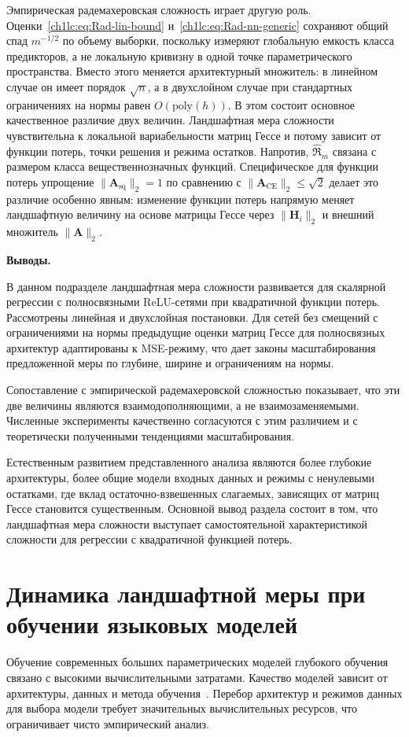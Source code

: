 Эмпирическая радемахеровская сложность играет другую роль. Оценки~\eqref{ch1lc:eq:Rad-lin-bound} и~\eqref{ch1lc:eq:Rad-nn-generic} сохраняют общий спад $m^{-1/2}$ по объему выборки, поскольку измеряют глобальную емкость класса предикторов, а не локальную кривизну в одной точке параметрического пространства. Вместо этого меняется архитектурный множитель: в линейном случае он имеет порядок $\sqrt{n}$, а в двухслойном случае при стандартных ограничениях на нормы равен $O(\mathrm{poly}(h))$. В этом состоит основное качественное различие двух величин. Ландшафтная мера сложности чувствительна к локальной вариабельности матриц Гессе и потому зависит от функции потерь, точки решения и режима остатков. Напротив, $\hat{\mathfrak{R}}_m$ связана с размером класса вещественнозначных функций. Специфическое для функции потерь упрощение $\|\mathbf{A}_{\mathrm{sq}}\|_2=1$ по сравнению с $\|\mathbf{A}_{\mathrm{CE}}\|_2\le\sqrt{2}$ делает это различие особенно явным: изменение функции потерь напрямую меняет ландшафтную величину на основе матрицы Гессе через $\|\mathbf{H}_i\|_2$ и внешний множитель $\|\mathbf{A}\|_2$.

\label{ch1lc:sec:conclusion}
\textbf{Выводы.}

В данном подразделе ландшафтная мера сложности развивается для скалярной регрессии с полносвязными ReLU-сетями при квадратичной функции потерь. Рассмотрены линейная и двухслойная постановки. Для сетей без смещений с ограничениями на нормы предыдущие оценки матриц Гессе для полносвязных архитектур адаптированы к MSE-режиму, что дает законы масштабирования предложенной меры по глубине, ширине и ограничениям на нормы.

Сопоставление с эмпирической радемахеровской сложностью показывает, что эти две величины являются взаимодополняющими, а не взаимозаменяемыми. Численные эксперименты качественно согласуются с этим различием и с теоретически полученными тенденциями масштабирования.

Естественным развитием представленного анализа являются более глубокие архитектуры, более общие модели входных данных и режимы с ненулевыми остатками, где вклад остаточно-взвешенных слагаемых, зависящих от матриц Гессе становится существенным. Основной вывод раздела состоит в том, что ландшафтная мера сложности выступает самостоятельной характеристикой сложности для регрессии с квадратичной функцией потерь.

\section{Динамика ландшафтной меры при обучении языковых моделей}
Обучение современных больших параметрических моделей глубокого обучения связано с высокими вычислительными затратами.
Качество моделей зависит от архитектуры, данных и метода обучения~\cite{kaplan2020ScalingLaws, hoffmann2022Chinchila}.
Перебор архитектур и режимов данных для выбора модели требует значительных вычислительных ресурсов, что ограничивает чисто эмпирический анализ.

